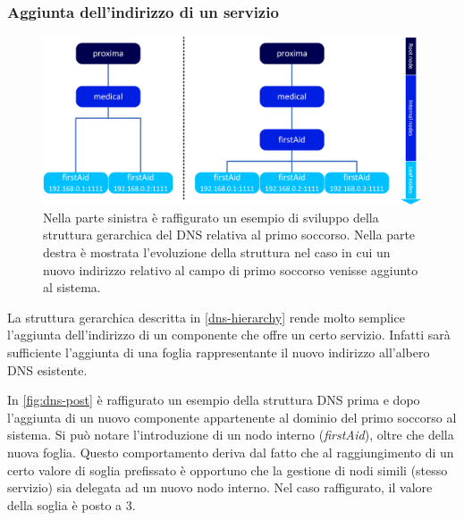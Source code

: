 \documentclass[a4paper,12pt]{report}
\begin{document}
\subsubsection{Aggiunta dell'indirizzo di un servizio}
\begin{figure}[H]
	\centering
	\includegraphics[scale=0.7]{./img/dns-post.png}
	\caption{Nella parte sinistra è raffigurato un esempio di sviluppo della struttura gerarchica del DNS relativa al primo soccorso. Nella parte destra è mostrata l'evoluzione della struttura nel caso in cui un nuovo indirizzo relativo al campo di primo soccorso venisse aggiunto al sistema. }
	\label{fig:dns-post}
\end{figure}
La struttura gerarchica descritta in \autoref{dns-hierarchy} rende molto semplice l'aggiunta dell'indirizzo di un componente che offre un certo servizio. Infatti sarà sufficiente l'aggiunta di una foglia rappresentante il nuovo indirizzo all'albero DNS esistente. 

In \autoref{fig:dns-post} è raffigurato un esempio della struttura DNS prima e dopo l'aggiunta di un nuovo componente appartenente al dominio del primo soccorso al sistema. Si può notare l'introduzione di un nodo interno (\emph{firstAid}), oltre che della nuova foglia. Questo comportamento deriva dal fatto che al raggiungimento di un certo valore di soglia prefissato è opportuno che la gestione di nodi simili (stesso servizio) sia delegata ad un nuovo nodo interno. Nel caso raffigurato, il valore della soglia è posto a 3.
\end{document}
